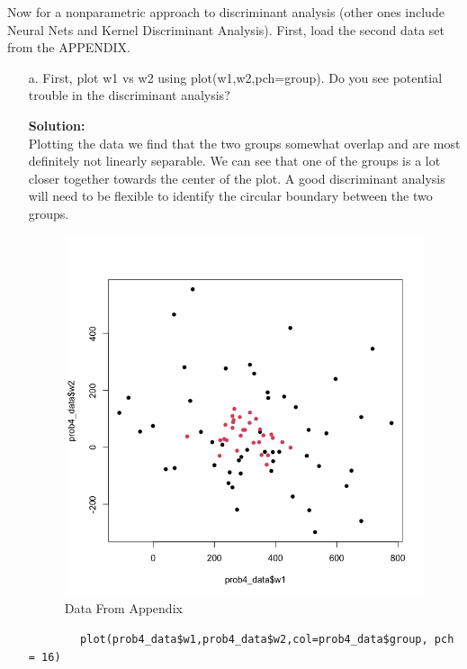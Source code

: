 \documentclass[12pt]{article}
\makeatletter
\theoremstyle{homework}
\newenvironment{exercise}[1]
{\def\@currentlabel{#1}\exercisecore}
{\endexercisecore}
\newcommand{\localhead}[1]{\par\smallskip\noindent\textbf{#1}\nobreak\\}%
\newcommand\solution{\localhead{Solution:}}
\makeatother
\begin{document}
\begin{exercise}{4}  Now for a nonparametric approach to discriminant analysis (other ones include Neural Nets and Kernel Discriminant
  Analysis). First, load the second data set from the APPENDIX.\\
  \begin{enumerate}
    \item[a.] First, plot w1 vs w2 using plot(w1,w2,pch=group). Do you see potential trouble in the discriminant analysis?\\
    \solution Plotting the data we find that the two groups somewhat overlap and are most definitely not linearly separable. 
    We can see that one of the groups is a lot closer together towards the center of the plot. A good discriminant 
    analysis will need to be flexible to identify the circular boundary between the two groups. 

    \begin{figure}[H]
      \begin{center}
        \caption{Data From Appendix}
      \includegraphics[width = .60\textwidth]{Rplot01.png}
      \end{center}
    \end{figure}
       \begin{footnotesize}
       \begin{verbatim}
        plot(prob4_data$w1,prob4_data$w2,col=prob4_data$group, pch = 16)
       \end{verbatim} 
       \end{footnotesize}

    \vspace{.15in}



\end{enumerate}
\end{exercise}
\end{document}
